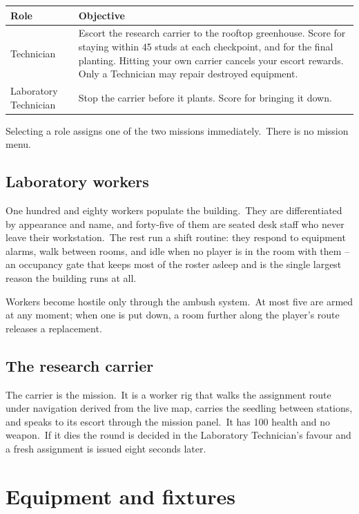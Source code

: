 \begin{center}
\begin{tabular}{@{}p{}p{}@{}}
\toprule
\textbf{Role} & \textbf{Objective} \\
\midrule
Technician & Escort the research carrier to the rooftop greenhouse. Score for staying within 45 studs at each checkpoint, and for the final planting. Hitting your own carrier cancels your escort rewards. Only a Technician may repair destroyed equipment. \\
Laboratory Technician & Stop the carrier before it plants. Score for bringing it down. \\
\bottomrule
\end{tabular}
\end{center}

Selecting a role assigns one of the two missions immediately.\ There is no
mission menu.\

\subsection{Laboratory workers}
One hundred and eighty workers populate the building.\ They are differentiated
by appearance and name, and forty-five of them are seated desk staff who never
leave their workstation.\ The rest run a shift routine: they respond to
equipment alarms, walk between rooms, and idle when no player is in the room
with them -- an occupancy gate that keeps most of the roster asleep and is the
single largest reason the building runs at all.\

Workers become hostile only through the ambush system.\ At most five are armed
at any moment; when one is put down, a room further along the player's route
releases a replacement.\

\subsection{The research carrier}
The carrier is the mission.\ It is a worker rig that walks the assignment route
under navigation derived from the live map, carries the seedling between
stations, and speaks to its escort through the mission panel.\ It has 100 health
and no weapon.\ If it dies the round is decided in the Laboratory Technician's
favour and a fresh assignment is issued eight seconds later.\

\section{Equipment and fixtures}

